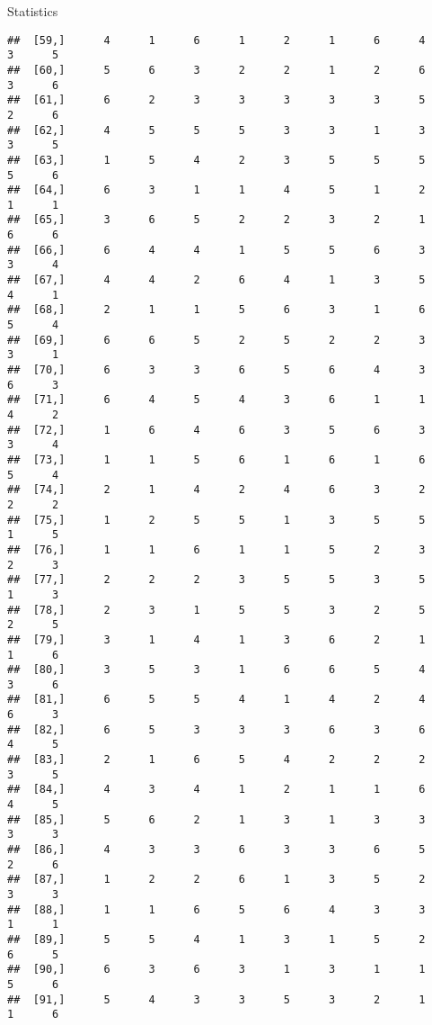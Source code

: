 \documentclass[
  ignorenonframetext,
]{beamer}
\begin{document}
\begin{frame}[fragile]{Statistics}
\begin{verbatim}
##  [59,]      4      1      6      1      2      1      6      4      3      5
##  [60,]      5      6      3      2      2      1      2      6      3      6
##  [61,]      6      2      3      3      3      3      3      5      2      6
##  [62,]      4      5      5      5      3      3      1      3      3      5
##  [63,]      1      5      4      2      3      5      5      5      5      6
##  [64,]      6      3      1      1      4      5      1      2      1      1
##  [65,]      3      6      5      2      2      3      2      1      6      6
##  [66,]      6      4      4      1      5      5      6      3      3      4
##  [67,]      4      4      2      6      4      1      3      5      4      1
##  [68,]      2      1      1      5      6      3      1      6      5      4
##  [69,]      6      6      5      2      5      2      2      3      3      1
##  [70,]      6      3      3      6      5      6      4      3      6      3
##  [71,]      6      4      5      4      3      6      1      1      4      2
##  [72,]      1      6      4      6      3      5      6      3      3      4
##  [73,]      1      1      5      6      1      6      1      6      5      4
##  [74,]      2      1      4      2      4      6      3      2      2      2
##  [75,]      1      2      5      5      1      3      5      5      1      5
##  [76,]      1      1      6      1      1      5      2      3      2      3
##  [77,]      2      2      2      3      5      5      3      5      1      3
##  [78,]      2      3      1      5      5      3      2      5      2      5
##  [79,]      3      1      4      1      3      6      2      1      1      6
##  [80,]      3      5      3      1      6      6      5      4      3      6
##  [81,]      6      5      5      4      1      4      2      4      6      3
##  [82,]      6      5      3      3      3      6      3      6      4      5
##  [83,]      2      1      6      5      4      2      2      2      3      5
##  [84,]      4      3      4      1      2      1      1      6      4      5
##  [85,]      5      6      2      1      3      1      3      3      3      3
##  [86,]      4      3      3      6      3      3      6      5      2      6
##  [87,]      1      2      2      6      1      3      5      2      3      3
##  [88,]      1      1      6      5      6      4      3      3      1      1
##  [89,]      5      5      4      1      3      1      5      2      6      5
##  [90,]      6      3      6      3      1      3      1      1      5      6
##  [91,]      5      4      3      3      5      3      2      1      1      6

\end{verbatim}
\end{frame}
\end{document}
